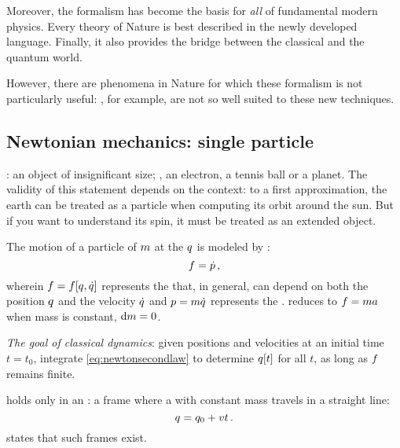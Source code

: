 Moreover, the formalism has become the basis for \emph{all} of fundamental modern physics. Every theory of Nature is best described in the newly developed language. Finally, it also provides the bridge between the classical and the quantum world.

However, there are phenomena in Nature for which these formalism is not particularly useful: , for example, are not so well suited to these new techniques.


\subsection{Newtonian mechanics: single particle}
%
: an object of insignificant size; \eg, an electron, a tennis ball or a planet. The validity of this statement depends on the context: to a first approximation, the earth can be treated as a particle when computing its orbit around the sun. But if you want to understand its spin, it must be treated as an extended object.

The motion of a particle of  $m$ at the  $q$ is modeled by :
%
\begin{equation}\label{eq:newtonsecondlaw}
  f = \dot{p}\,,
\end{equation}
%
wherein $f = f\!\left[{q,\dot{q}}\right]$ represents the  that, in general, can depend on both the position $q$ and the velocity $\dot{q}$
%
%
and $p = m\dot{q}$ represents the .  reduces to $f = ma$ when mass is constant, $\text{d}m = 0$.

\emph{The goal of classical dynamics}: given positions and velocities at an initial time $t = t_0$, integrate \cref{eq:newtonsecondlaw} to determine $q\!\left[{t}\right]$ for all $t$, as long as $f$ remains finite. 

 holds only in an : a frame where a  with constant mass travels in a straight line:
%
%
\begin{equation}\label{eq:straightlinemotion}
  q = q_0 + v t\,.
\end{equation}
%
 states that such frames exist.

